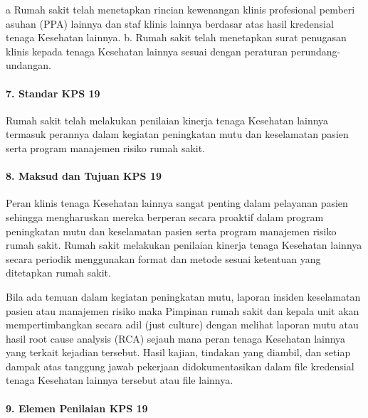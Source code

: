 \documentclass[
]{book}
\begin{document}
a Rumah sakit telah menetapkan rincian kewenangan klinis profesional pemberi asuhan (PPA) lainnya dan staf klinis lainnya berdasar atas hasil kredensial tenaga Kesehatan lainnya.
b. Rumah sakit telah menetapkan surat penugasan klinis kepada tenaga Kesehatan lainnya sesuai dengan peraturan perundang-undangan.

\hypertarget{standar-kps-19}{%
\paragraph*{7. Standar KPS 19}\label{standar-kps-19}}

Rumah sakit telah melakukan penilaian kinerja tenaga Kesehatan lainnya termasuk perannya dalam kegiatan peningkatan mutu dan keselamatan pasien serta program manajemen risiko rumah sakit.

\hypertarget{maksud-dan-tujuan-kps-19}{%
\paragraph*{8. Maksud dan Tujuan KPS 19}\label{maksud-dan-tujuan-kps-19}}

Peran klinis tenaga Kesehatan lainnya sangat penting dalam pelayanan pasien sehingga mengharuskan mereka berperan secara proaktif dalam program peningkatan mutu dan keselamatan pasien serta program manajemen risiko rumah sakit.
Rumah sakit melakukan penilaian kinerja tenaga Kesehatan lainnya secara periodik menggunakan format dan metode sesuai ketentuan yang ditetapkan rumah sakit.

Bila ada temuan dalam kegiatan peningkatan mutu, laporan insiden keselamatan pasien atau manajemen risiko maka Pimpinan rumah sakit dan kepala unit akan mempertimbangkan secara adil (just culture) dengan melihat laporan mutu atau hasil root cause analysis (RCA) sejauh mana peran tenaga Kesehatan lainnya yang terkait kejadian tersebut.
Hasil kajian, tindakan yang diambil, dan setiap dampak atas tanggung jawab pekerjaan didokumentasikan dalam file kredensial tenaga Kesehatan lainnya tersebut atau file lainnya.

\hypertarget{elemen-penilaian-kps-19}{%
\paragraph*{9. Elemen Penilaian KPS 19}\label{elemen-penilaian-kps-19}}
\end{document}
